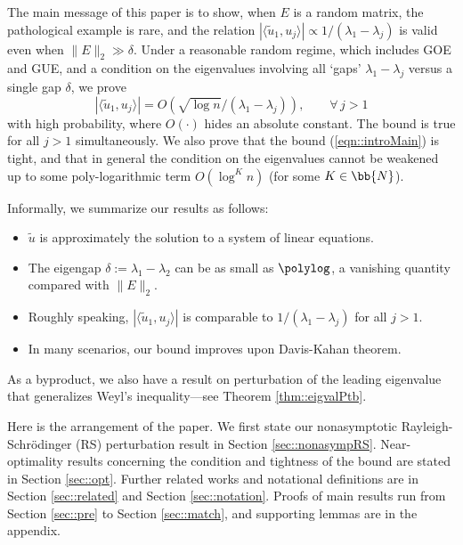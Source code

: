 \documentclass[12pt]{article}%
\theoremstyle{plain}%
\theoremstyle{remark}
\begin{document}

The main message of this paper is to show, when $E$ is a random matrix, the pathological example is rare, and the relation $|\langle \tilde{u}_1, u_j \rangle| \propto 1/(\lambda_1 - \lambda_j)$ is valid even when $\| E \|_2 \gg \delta$. Under a reasonable random regime, which includes GOE and GUE, and a condition on the eigenvalues involving all `gaps' $\lambda_1 - \lambda_j$ versus a single gap $\delta$, we prove
\begin{equation}\label{eqn::introMain}
|\langle \tilde{u}_1, u_j \rangle| = O(\sqrt{\log n} / (\lambda_1 - \lambda_j) ), \qquad \forall \, j > 1
\end{equation}
with high probability, where $O(\cdot)$ hides an absolute constant. The bound is true for all $j>1$ simultaneously. We also prove that the bound (\ref{eqn::introMain}) is tight, and that in general the condition on the eigenvalues cannot be weakened up to some poly-logarithmic term $O(\log^K n)$ (for some $K \in \bb{N}$).

Informally, we summarize our results as follows:
\begin{itemize}
\item $\tilde{u}$ is approximately the solution to a system of linear equations. 
\item The eigengap $\delta := \lambda_1 - \lambda_2$ can be as small as $\polylog$, a vanishing quantity compared with $\| E \|_2$. 
\item Roughly speaking, $|\langle \tilde{u}_1, u_j \rangle|$ is comparable to $1/(\lambda_1  - \lambda_j)$ for all $j > 1$.
\item In many scenarios, our bound improves upon Davis-Kahan theorem.
\end{itemize}

As a byproduct, we also have a result on perturbation of the leading eigenvalue that generalizes Weyl's inequality---see Theorem \ref{thm::eigvalPtb}.

Here is the arrangement of the paper. We first state our nonasymptotic Rayleigh-Schr\"{o}dinger (RS) perturbation result in Section \ref{sec::nonasympRS}. Near-optimality results concerning the condition and tightness of the bound are stated in Section \ref{sec::opt}. Further related works and notational definitions are in Section \ref{sec::related} and Section \ref{sec::notation}. Proofs of main results run from Section \ref{sec::pre} to Section \ref{sec::match}, and supporting lemmas are in the appendix.
\end{document}
